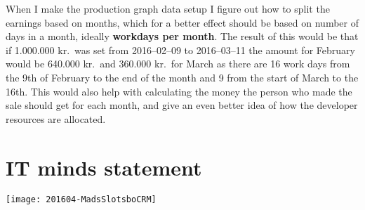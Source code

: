 When I make the production graph data setup I figure out how to split the
earnings based on months, which for a better effect should be based on number of
days in a month, ideally \textbf{workdays per month}. The result of this would be that if
1.000.000 kr.\ was set from 2016--02--09 to 2016--03--11 the amount for February
would be 640.000 kr.\ and 360.000 kr.\ for March as there are 16 work days from
the 9th of February to the end of the month and 9 from the start of March to the
16th. This would also help with calculating the money the person who made the
sale should get for each month, and give an even better idea of how the
developer resources are allocated.

\section{IT minds statement}
\texttt{[image: 201604-MadsSlotsboCRM]}